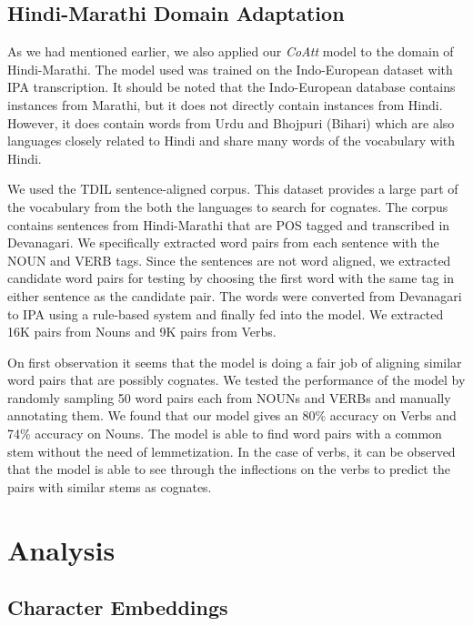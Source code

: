 \documentclass[11pt,letterpaper]{article}
\begin{document}
\subsection{Hindi-Marathi Domain Adaptation}

As we had mentioned earlier, we also applied our \textit{CoAtt} model to the domain of Hindi-Marathi. The model used was trained on the Indo-European dataset with IPA transcription. It should be noted that the Indo-European database contains instances from Marathi, but it does not directly contain instances from Hindi. However, it does contain words from Urdu and Bhojpuri (Bihari) which are also languages closely related to Hindi and share many words of the vocabulary with Hindi.

We used the TDIL sentence-aligned corpus. This dataset provides a large part of the vocabulary from the both the languages to search for cognates. The corpus contains sentences from Hindi-Marathi that are POS tagged and transcribed in Devanagari. We specifically extracted word pairs from each sentence with the NOUN and VERB tags. Since the sentences are not word aligned, we extracted candidate word pairs for testing by choosing the first word with the same tag in either sentence as the candidate pair. The words were converted from Devanagari to IPA using a rule-based system and finally fed into the model. We extracted 16K pairs from Nouns and 9K pairs from Verbs.

On first observation it seems that the model is doing a fair job of aligning similar word pairs that are possibly cognates. We tested the performance of the model by randomly sampling 50 word pairs each from NOUNs and VERBs and manually annotating them. We found that our model gives an 80\% accuracy on Verbs and 74\% accuracy on Nouns. The model is able to find word pairs with a common stem without the need of lemmetization. In the case of verbs, it can be observed that the model is able to see through the inflections on the verbs to predict the pairs with similar stems as cognates. 

\section{Analysis}

\subsection{Character Embeddings}
\end{document}
